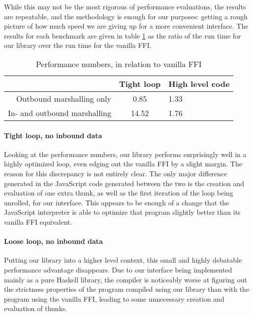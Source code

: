 \documentclass{sigplanconf}
\begin{document}
While this may not be the most rigorous of performance evaluations,
the results are repeatable, and the methodology is enough for our purposes:
getting a rough picture of how much speed we are giving up for a more
convenient interface.
The results for each benchmark are given in table \ref{tbl:performance} as
the ratio of the run time for our library over the run time for the vanilla
FFI.

\begin{table}
  \renewcommand{\arraystretch}{1.5}
  \begin{center}
    \begin{tabular}{|r|c|l|}
      \hline
                                   & Tight loop & High level code \\
      \hline
      Outbound marshalling only    & 0.85       & 1.33 \\
      \hline
      In- and outbound marshalling & 14.52      & 1.76 \\
      \hline
    \end{tabular}
  \end{center}
  \caption{Performance numbers, in relation to vanilla FFI}
  \label{tbl:performance}
\end{table}

\paragraph{Tight loop, no inbound data}
Looking at the performance numbers, our library performs surprisingly well in
a highly optimized loop, even edging out the vanilla FFI by a slight margin.
The reason for this discrepancy is not entirely clear. The only major difference
generated in the JavaScript code generated between the two is the creation and
evaluation of one extra thunk, as well as the first iteration of the loop
being unrolled, for our interface. This appears to be enough of a change that
the JavaScript interpreter is able to optimize that program slightly better
than its vanilla FFI equivalent.

\paragraph{Loose loop, no inbound data}
Putting our library into a higher level context, this small and highly
debatable performance advantage disappears. Due to our interface being
implemented mainly as a pure Haskell library, the compiler is noticeably worse
at figuring out the strictness properties of the program compiled using our
library than with the program using the vanilla FFI, leading to some
unnecessary creation and evaluation of thunks.
\end{document}
